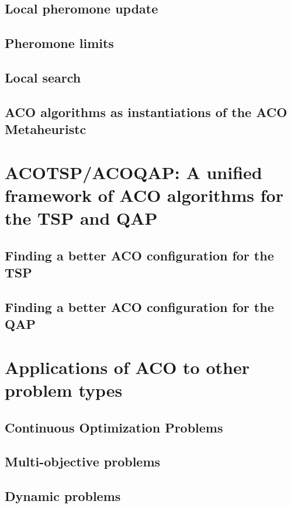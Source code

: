 \documentclass[12pt]{article}
\begin{document}
\subsection{Local pheromone update}

\subsection{Pheromone limits}

\subsection{Local search}

\subsection{ACO algorithms as instantiations of the ACO Metaheuristc}

\section{ACOTSP/ACOQAP: A unified framework of ACO algorithms
for the TSP and QAP}

\subsection{Finding a better ACO configuration for the TSP}

\subsection{Finding a better ACO configuration for the QAP}

\section{Applications of ACO to other problem types}

\subsection{Continuous Optimization Problems}

\subsection{Multi-objective problems}

\subsection{Dynamic problems}
\end{document}

